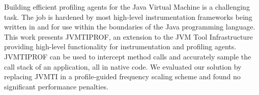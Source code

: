 Building efficient profiling agents for the Java Virtual Machine is a challenging task. The job is hardened by most high-level instrumentation frameworks being written in and for use within the boundaries of the Java programming language. This work presents JVMTIPROF, an extension to the JVM Tool Infrastructure providing high-level functionality for instrumentation and profiling agents. JVMTIPROF can be used to intercept method calls and accurately sample the call stack of an application, all in native code. We evaluated our solution by replacing JVMTI in a profile-guided frequency scaling scheme and found no significant performance penalties.
